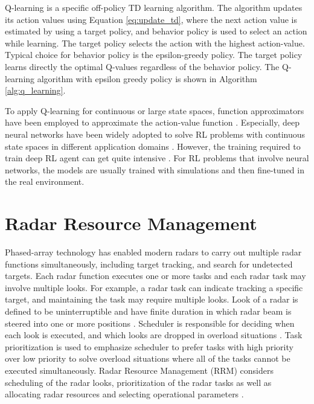 \documentclass[english, 12pt, a4paper, elec, utf8, a-1b, online]{aaltothesis}
\begin{document}
Q-learning is a specific off-policy TD learning algorithm. 
The algorithm updates its action values using Equation \eqref{eq:update_td}, where the next action value is estimated by using a target policy, 
and behavior policy is used to select an action while learning. 
The target policy selects the action with the highest action-value.
Typical choice for behavior policy is the epsilon-greedy policy. 
The target policy learns directly the optimal Q-values regardless of the behavior policy. 
The Q-learning algorithm with epsilon greedy policy is shown in Algorithm \ref{alg:q_learning}.

To apply Q-learning for continuous or large state spaces, function approximators have been employed to approximate the action-value function \cite{Sutton2018}. 
Especially, deep neural networks have been widely adopted to solve RL problems with continuous state spaces in different application domains \cite{Mnih2013, Zhang2018, Luong2018}.
However, the training required to train deep RL agent can get quite intensive \cite{Irpan2018}.
For RL problems that involve neural networks, the models are usually trained with simulations and then fine-tuned in the real environment.


\clearpage
\section{Radar Resource Management} \label{sec:existing_RRM}


Phased-array technology has enabled modern radars to carry out multiple radar functions simultaneously, including target tracking, and search for undetected targets.
Each radar function executes one or more tasks and each radar task may involve multiple looks.
For example, a radar task can indicate tracking a specific target, and maintaining the task may require multiple looks.
Look of a radar is defined to be uninterruptible and have finite duration in which radar beam is steered into one or more positions \cite{Moo2016}.
Scheduler is responsible for deciding when each look is executed, and which looks are dropped in overload situations \cite{Moo2016}. 
Task prioritization is used to emphasize scheduler to prefer tasks with high priority over low priority to solve overload situations where all of the tasks cannot be executed simultaneously.
Radar Resource Management (RRM) considers scheduling of the radar looks, prioritization of the radar tasks as well as allocating radar resources and selecting operational parameters \cite{Moo2016}. 
\end{document}
